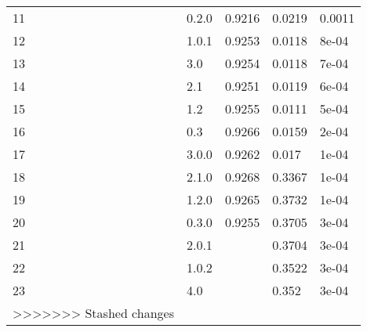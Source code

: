 \begin{table}[ht]
\begin{tabular}{lllll}
  11 & 0.2.0 & 0.9216 & 0.0219 & 0.0011 \\ 
  12 & 1.0.1 & 0.9253 & 0.0118 & 8e-04 \\ 
  13 & 3.0 & 0.9254 & 0.0118 & 7e-04 \\ 
  14 & 2.1 & 0.9251 & 0.0119 & 6e-04 \\ 
  15 & 1.2 & 0.9255 & 0.0111 & 5e-04 \\ 
  16 & 0.3 & 0.9266 & 0.0159 & 2e-04 \\ 
  17 & 3.0.0 & 0.9262 & 0.017 & 1e-04 \\ 
  18 & 2.1.0 & 0.9268 & 0.3367 & 1e-04 \\ 
  19 & 1.2.0 & 0.9265 & 0.3732 & 1e-04 \\ 
  20 & 0.3.0 & 0.9255 & 0.3705 & 3e-04 \\ 
  21 & 2.0.1 &  & 0.3704 & 3e-04 \\ 
  22 & 1.0.2 &  & 0.3522 & 3e-04 \\ 
  23 & 4.0 &  & 0.352 & 3e-04 \\ 
>>>>>>> Stashed changes
   \hline
\end{tabular}
\end{table}
